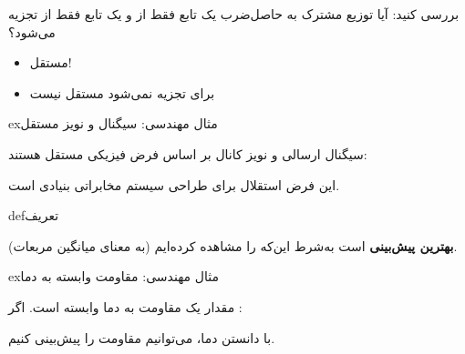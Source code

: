 
بررسی کنید: آیا توزیع مشترک به حاصل‌ضرب یک تابع فقط از  و یک تابع فقط از  تجزیه می‌شود؟

\begin{itemize}
\tightlist
\item
   مستقل!
\item
   برای  تجزیه نمی‌شود \lr{\mbox{\ensuremath{\to}}} مستقل نیست
\end{itemize}

\begin{PSbox}[unbreakable]{ex}{مثال مهندسی: سیگنال و نویز مستقل}

سیگنال ارسالی  و نویز کانال  بر اساس فرض فیزیکی مستقل هستند:\PSbr{}

این فرض استقلال برای طراحی سیستم مخابراتی بنیادی است.

\end{PSbox}


\begin{PSbox}[unbreakable]{def}{تعریف}


\end{PSbox}


 \textbf{بهترین پیش‌بینی}  است به‌شرط این‌که  را مشاهده کرده‌ایم (به معنای میانگین مربعات).

\begin{PSbox}[unbreakable]{ex}{مثال مهندسی: مقاومت وابسته به دما}

مقدار یک مقاومت  به دما  وابسته است. اگر :


با دانستن دما، می‌توانیم مقاومت را پیش‌بینی کنیم.

\end{PSbox}

